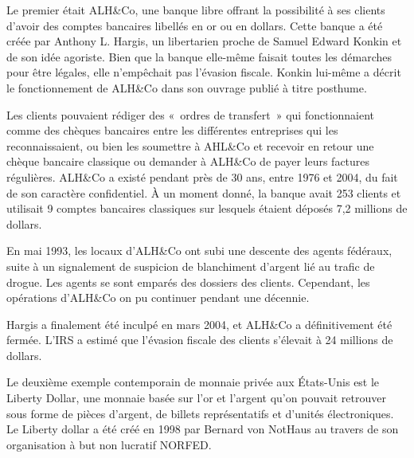 
Le premier était ALH\&Co, une banque libre offrant la possibilité à ses clients d'avoir des comptes bancaires libellés en or ou en dollars. Cette banque a été créée par Anthony L. Hargis, un libertarien proche de Samuel Edward Konkin et de son idée agoriste. Bien que la banque elle-même faisait toutes les démarches pour être légales, elle n'empêchait pas l'évasion fiscale. Konkin lui-même a décrit le fonctionnement de ALH\&Co dans son ouvrage  publié à titre posthume.

Les clients pouvaient rédiger des «~ordres de transfert~» qui fonctionnaient comme des chèques bancaires entre les différentes entreprises qui les reconnaissaient, ou bien les soumettre à AHL\&Co et recevoir en retour une chèque bancaire classique ou demander à ALH\&Co de payer leurs factures régulières. ALH\&Co a existé pendant près de 30 ans, entre 1976 et 2004, du fait de son caractère confidentiel. À un moment donné, la banque avait 253 clients et utilisait 9 comptes bancaires classiques sur lesquels étaient déposés 7,2 millions de dollars.

En mai 1993, les locaux d'ALH\&Co ont subi une descente des agents fédéraux, suite à un signalement de suspicion de blanchiment d'argent lié au trafic de drogue. Les agents se sont emparés des dossiers des clients. Cependant, les opérations d'ALH\&Co on pu continuer pendant une décennie.

Hargis a finalement été inculpé en mars 2004, et ALH\&Co a définitivement été fermée. L'IRS a estimé que l'évasion fiscale des clients s'élevait à 24 millions de dollars.


Le deuxième exemple contemporain de monnaie privée aux États-Unis est le Liberty Dollar, une monnaie basée sur l'or et l'argent qu'on pouvait retrouver sous forme de pièces d'argent, de billets représentatifs et d'unités électroniques. Le Liberty dollar a été créé en 1998 par Bernard von NotHaus au travers de son organisation à but non lucratif NORFED.

